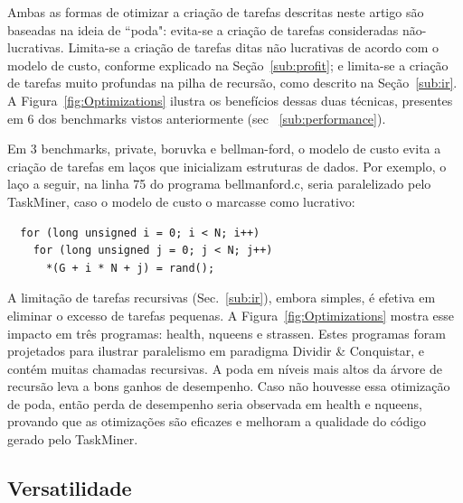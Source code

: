 \documentclass[sigplan,10pt,review]{acmart}
\newcommand\Taskminer{\mbox{\textsf{TaskMiner}}}
\begin{document}
Ambas as formas de 
otimizar a criação de tarefas descritas neste artigo são baseadas na ideia de 
``poda": evita-se a criação de tarefas consideradas não-lucrativas. 
Limita-se a criação de tarefas ditas não lucrativas de acordo com o modelo de custo, 
conforme explicado na 
Seção~\ref{sub:profit}; e limita-se a criação de tarefas muito profundas na pilha de recursão, 
como descrito na Seção~\ref{sub:ir}. A Figura~\ref{fig:Optimizations} ilustra os benefícios dessas duas técnicas,
presentes em 6 dos benchmarks vistos anteriormente (sec ~\ref{sub:performance}).

Em 3 benchmarks, \textsf{private}, \textsf{boruvka} e
\textsf{bellman-ford}, o modelo de custo evita a criação de tarefas em laços que inicializam estruturas de dados.
Por exemplo, o laço a seguir, na linha 75 do programa \textsf{bellmanford.c}, seria paralelizado pelo
\Taskminer{}, caso o modelo de custo o marcasse como lucrativo:

\begin{verbatim}
  for (long unsigned i = 0; i < N; i++)
    for (long unsigned j = 0; j < N; j++)
      *(G + i * N + j) = rand();
\end{verbatim}

A limitação de tarefas recursivas (Sec.~\ref{sub:ir}), embora simples,
é efetiva em eliminar o excesso de tarefas pequenas. 
A Figura~\ref{fig:Optimizations} mostra esse impacto em três programas: \textsf{health}, \textsf{nqueens} e
\textsf{strassen}. Estes programas foram projetados para ilustrar paralelismo
em paradigma Dividir \& Conquistar, e contém muitas chamadas
recursivas. A poda em níveis mais altos da árvore de recursão leva a bons ganhos de desempenho. 
Caso não houvesse essa otimização de poda, então perda de desempenho seria observada
em  \textsf{health} e \textsf{nqueens}, provando que as otimizações são eficazes e melhoram
a qualidade do código gerado pelo \Taskminer{}.

\subsection{Versatilidade}
\label{sub:versatility}
\end{document}
